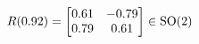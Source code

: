 \documentclass[preview]{standalone}
\begin{document}
\begin{align*}
\special{dvisvgm:raw <g id='unique000'>}R(0.92) = \begin{bmatrix} 0.61 & -0.79 \\ 0.79 & 0.61 \end{bmatrix} \in \text{SO}(2)\special{dvisvgm:raw </g>}
\end{align*}
\end{document}
